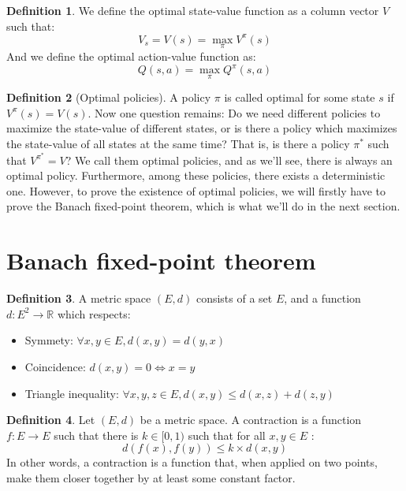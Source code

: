\documentclass{article}
\theoremstyle{definition}
\newtheorem{definition}{Definition}[section]
\theoremstyle{remark}
\theoremstyle{example}
\begin{document}
\begin{definition}
		We define the optimal state-value function as a column vector $V$ such that:
				$$V_s = V(s) = \max_\pi V^\pi(s)$$
		And we define the optimal action-value function as:
				$$Q(s, a) = \max_\pi Q^\pi(s, a)$$
\end{definition}

\begin{definition}[Optimal policies]
		A policy $\pi$ is called optimal for some state $s$ if $V^\pi(s) = V(s)$. Now one question remains: Do we need different policies to maximize the state-value of different states, or is there a policy which maximizes the state-value of all states at the same time? That is, is there a policy $\pi^*$ such that $V^{\pi^*} = V$? We call them optimal policies, and as we'll see, there is always an optimal policy. Furthermore, among these policies, there exists a deterministic one. However, to prove the existence of optimal policies, we will firstly have to prove the Banach fixed-point theorem, which is what we'll do in the next section.
\end{definition}

\section{Banach fixed-point theorem}

\begin{definition}
    A metric space $(E, d)$ consists of a set $E$, and a function $d : E^2 \rightarrow \mathbb{R}$ which respects:
    \begin{itemize}
        \item Symmety: $\forall x, y \in E, d(x, y) = d(y, x)$
        \item Coincidence: $d(x, y) = 0 \iff x = y$
        \item Triangle inequality: $\forall x, y, z \in E, d(x, y) \leq d(x, z) + d(z, y)$
    \end{itemize}
\end{definition}

\begin{definition}
    Let $(E, d)$ be a metric space. A contraction is a function $f : E \rightarrow E$ such that there is $k \in [0, 1)$ such that for all $x, y \in E$ :
        $$d(f(x), f(y)) \leq k \times d(x, y)$$
    In other words, a contraction is a function that, when applied on two points, make them closer together by at least some constant factor.
\end{definition}
\end{document}
